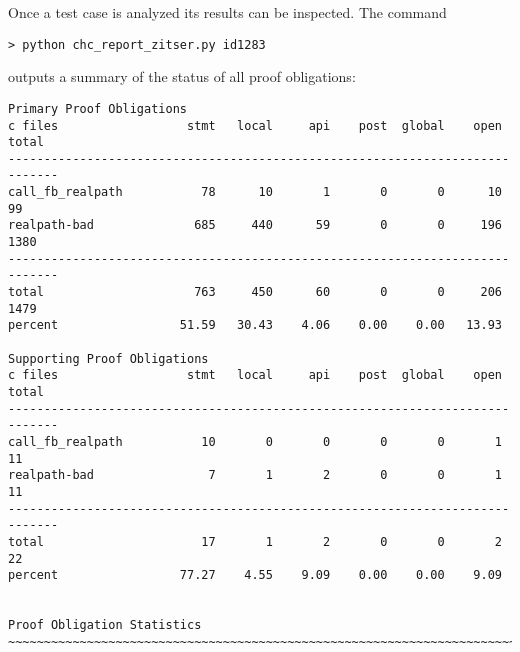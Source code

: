 \documentclass[11pt]{article}
\begin{document}
Once a test case is analyzed its results can be inspected. The command
\begin{verbatim}
> python chc_report_zitser.py id1283
\end{verbatim}
outputs a summary of the status of all proof obligations:
\begin{scriptsize}
\begin{verbatim}
Primary Proof Obligations
c files                  stmt   local     api    post  global    open   total
-----------------------------------------------------------------------------
call_fb_realpath           78      10       1       0       0      10      99
realpath-bad              685     440      59       0       0     196    1380
-----------------------------------------------------------------------------
total                     763     450      60       0       0     206    1479
percent                 51.59   30.43    4.06    0.00    0.00   13.93

Supporting Proof Obligations
c files                  stmt   local     api    post  global    open   total
-----------------------------------------------------------------------------
call_fb_realpath           10       0       0       0       0       1      11
realpath-bad                7       1       2       0       0       1      11
-----------------------------------------------------------------------------
total                      17       1       2       0       0       2      22
percent                 77.27    4.55    9.09    0.00    0.00    9.09


Proof Obligation Statistics
~~~~~~~~~~~~~~~~~~~~~~~~~~~~~~~~~~~~~~~~~~~~~~~~~~~~~~~~~~~~~~~~~~~~~~~~~~~~~~~~


\end{verbatim}
\end{scriptsize}
\end{document}
